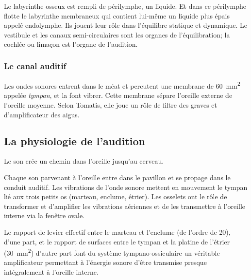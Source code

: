 Le labyrinthe
osseux est rempli de périlymphe, un liquide. Et dans ce périlymphe
flotte le labyrinthe membraneux qui contient lui-même un liquide
plus épais appelé endolymphe. Ils jouent leur rôle dans l'équilibre
statique et dynamique. Le vestibule et les canaux semi-circulaires
sont les organes de l'équilibration; la cochlée ou
limaçon est l'organe de l'audition. 

\subsubsection{Le canal auditif}
Les ondes sonores entrent dans le méat et percutent
une membrane de \SI{60}{\milli\metre\squared} appelée \emph{tympan}, et la font vibrer. Cette membrane
sépare l'oreille externe de l'oreille moyenne. Selon Tomatis, elle
joue un rôle de filtre des graves et d'amplificateur des aigus.



\subsection{La physiologie de l'audition}

Le  son crée un chemin dans 
l'oreille\autocite[chap. 8, pp. 322--324]{marieb:biologie} jusqu'au cerveau.

Chaque son parvenant à l'oreille entre dans le pavillon et se propage
dans le conduit auditif. Les vibrations de l'onde sonore mettent en
mouvement le tympan lié aux trois petits os (marteau, enclume, étrier).
Les osselets ont le rôle de transformer et d'amplifier les vibrations
aériennes et de les transmettre à l'oreille interne via la fenêtre
ovale.

Le rapport de levier effectif entre le marteau et l'enclume
(de l'ordre de 20), d'une part, et le
rapport de surfaces entre le tympan et la platine de l'étrier
(\SI{30}{\milli\metre\squared}) d\textquoteright autre part font du système tympano-ossiculaire
un véritable amplificateur permettant à l\textquoteright énergie sonore
d\textquoteright être transmise presque intégralement à l\textquoteright oreille
interne.

